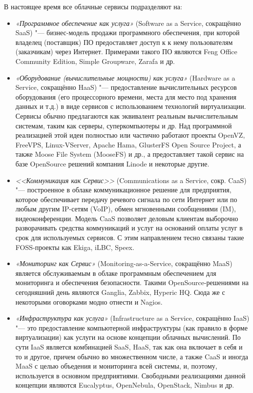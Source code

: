 \documentclass[a5paper,10pt]{article}
\begin{document}
В настоящее время все облачные сервисы подразделяют на:
\begin{itemize}
\item \emph{«Программное обеспечение как услуга»} (Software as a Service, сокращённо SaaS) "--- бизнес-модель продажи программного \linebreak обеспечения, при которой владелец (поставщик) ПО предоставляет доступ к к нему пользователям (заказчикам) через Интернет. Примерами такого ПО являются Feng Office Community Edition, Simple Groupware, Zarafa и др.
\item \emph{«Оборудование (вычислительные мощности) как услуга»} \linebreak (Hardware as a Service, сокращённо HaaS) "--- предоставление  вычислительных ресурсов оборудования (его процессорного времени, места для место под хранения данных и т.д.) в виде сервисов с использованием технологий виртуализации. Сервисы обычно предлагаются как эквивалент реальным вычислительным системам, таким как серверы, суперкомпьютеры и др. Над программной реализацией этой идеи полностью или частично работают проекты OpenVZ, FreeVPS, Linux-VServer, Apache Hama, GlusterFS Open Source Project, а также Moose File System (MooseFS) и др., а предоставляет такой сервис на базе OpenSource решений компания Linode и некоторые другие.
\item \emph{<<Коммуникация как Сервис>>} (Communications as a Service, сокр. CaaS) "--- построенное в облаке коммуникационное решение для предприятия, которое обеспечивает передачу речевого сигнала по сети Интернет или по любым другим IP-сетям (VoIP), обмен мгновенными сообщениями (IM), видеоконференции. Модель CaaS позволяет деловым клиентам выборочно разворачивать средства коммуникаций и услуг на оснований оплаты услуг в срок для используемых сервисов. С этим направлением тесно связаны такие FOSS-проекты как Ekiga, iLBC, Speex.
\item \emph{«Мониторинг как Сервис»} (Monitoring-as-a-Service, сокращённо MaaS) является обслуживаемым в облаке программным обеспечением для мониторинга и обеспечения безопасности. Такими OpenSource-решениями на сегодняшний день являются Ganglia, Zabbix, Hyperic HQ. Сюда же  с некоторыми оговорками модно отнести и Nagios. 
\item \emph{«Инфраструктура как услуга»} (Infrastructure as a Service, сокращённо IaaS) "--- это предоставление компьютерной инфраструктуры (как правило в форме виртуализации) как услуги на основе концепции облачных вычислений. По сути IaaS является комбинацией SaaS,  HaaS, так как она включает в себя и то и другое, причем обычно во множественном числе, а также CaaS и иногда MaaS с целью объедения и мониторинга всей системы, и, поэтому, используется в основном предприятиями. Свободными реализациями данной концепции являются Eucalyptus, OpenNebula, OpenStack, Nimbus и др.

\end{itemize}
\end{document}

